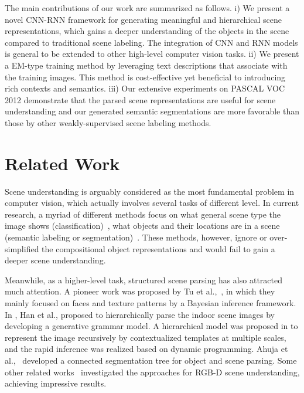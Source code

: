 \documentclass[10pt,twocolumn,letterpaper]{article}
\begin{document}
The main contributions of our work are summarized as follows. i) We present a novel CNN-RNN framework for generating meaningful and hierarchical scene representations, which gains a deeper understanding of the objects in the scene compared to traditional scene labeling. The integration of CNN and RNN models is general to be extended to other high-level computer vision tasks. ii) We present a EM-type training method by leveraging text descriptions that associate with the training images. This method is cost-effective yet beneficial to introducing rich contexts and semantics. iii) Our extensive experiments on PASCAL VOC 2012 demonstrate that the parsed scene representations are useful for scene understanding and our generated semantic segmentations are more favorable than those by other weakly-supervised scene labeling methods.



\section{Related Work}

Scene understanding is arguably considered as the most fundamental problem in computer vision, which actually involves several tasks of different level. In current research, a myriad of different methods focus on what general scene type the image shows (classification)~\cite{DBLP:VisualAttr}\cite{DBLP:Multi-Class}\cite{DBLP:fine-grained}, what objects and their locations are in a scene (semantic labeling or segmentation)~\cite{DBLP:Seg-03}\cite{DBLP:Seg-09}\cite{DBLP:Seg-15}\cite{tighe2014scene}. These methods, however, ignore or over-simplified the compositional object representations and would fail to gain a deeper scene understanding.


Meanwhile, as a higher-level task, structured scene parsing has also attracted much attention. A pioneer work was proposed by Tu et al.,~\cite{tu2005image}, in which they mainly focused on faces and texture patterns by a Bayesian inference framework. In \cite{DBLP:ImageParsing-Attribute}, Han et al., proposed to hierarchically parse the indoor scene images by developing a generative grammar model. A hierarchical model was proposed in \cite{zhu2012recursive} to represent the image recursively by contextualized templates at multiple scales, and the rapid inference was realized based on dynamic programming. Ahuja et al.,~\cite{ahuja2008connected} developed a connected segmentation tree for object and scene parsing. Some other related works~\cite{silberman2012indoor}\cite{gupta2013perceptual} investigated the approaches for RGB-D scene understanding, achieving impressive results.
\end{document}

